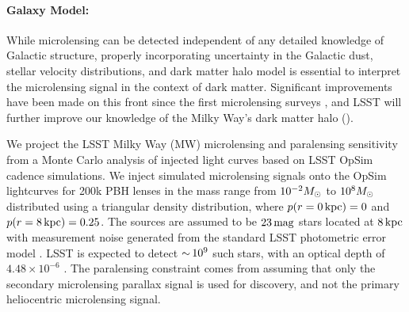 \paragraph{Galaxy Model:} While microlensing can be detected independent of any detailed knowledge of Galactic structure, properly incorporating uncertainty in the Galactic dust, stellar velocity distributions, and dark matter halo model is essential to interpret the microlensing signal in the context of dark matter.
Significant improvements have been made on this front since the first microlensing surveys \citep[e.g.,][]{2018MNRAS.479.2889C}, and LSST will further improve our knowledge of the Milky Way's dark matter halo ().




We project the LSST Milky Way (MW) microlensing and paralensing sensitivity  from a Monte Carlo analysis of injected light curves based on LSST OpSim cadence simulations.
We inject simulated microlensing signals onto the OpSim lightcurves for 200k PBH lenses in the mass range from $10^{-2}M_\odot$ to $10^{8}M_\odot$ distributed using a triangular density distribution, where $p(r = 0 \mathrm{\,kpc}) = 0$ and $p(r = 8\mathrm{\,kpc}) = 0.25$.
The sources are assumed to be $23\mathrm{\,mag}$ stars located at $8\mathrm{\,kpc}$ with measurement noise generated from the standard LSST photometric error model \citep{0805.2366}.
LSST is expected to detect $ {\sim}\, 10^{9}$ such stars, with an optical depth of $4.48 \times 10^{-6}$ \citep{2006ApJ...636..240S}.
The paralensing constraint comes from assuming that only the secondary microlensing parallax signal is used for discovery, and not the primary heliocentric microlensing signal.


